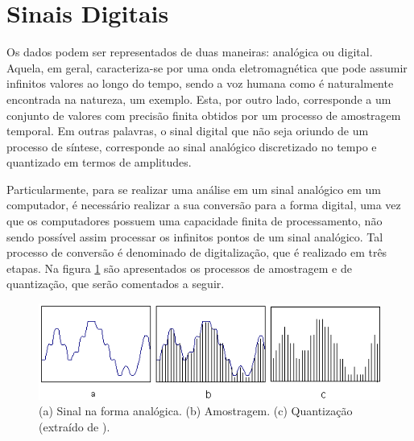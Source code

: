\documentclass[a4paper,12pt,twoside,openright]{report}
\begin{document}
\section{Sinais Digitais}
\label{sinais_digitais}
\par Os dados podem ser representados de duas maneiras: anal\'{o}gica ou digital. Aquela, em geral, caracteriza-se por uma onda eletromagn\'{e}tica que pode assumir infinitos valores ao longo do tempo, sendo a voz humana como \'{e} naturalmente encontrada na natureza, um exemplo. Esta, por outro lado, corresponde a um conjunto de valores com precis\~{a}o finita obtidos por um processo de amostragem temporal. Em outras palavras, o sinal digital que n\~{a}o seja oriundo de um processo de s\'{i}ntese, corresponde ao sinal anal\'{o}gico discretizado no tempo e quantizado em termos de amplitudes. 
\\
\par Particularmente, para se realizar uma an\'{a}lise em um sinal anal\'{o}gico em um computador, \'{e} necess\'{a}rio realizar a sua convers\~{a}o para a forma digital, uma vez que os computadores possuem uma capacidade finita de processamento, n\~{a}o sendo poss\'{i}vel assim processar os infinitos pontos de um sinal anal\'{o}gico. Tal processo de convers\~{a}o \'{e} denominado de digitaliza{\c c}\~{a}o, que \'{e} realizado em tr\^{e}s etapas. Na figura \ref{figura:quantizacao} s\~{a}o apresentados os processos de amostragem e de quantiza{\c c}\~{a}o, que ser\~{a}o comentados a seguir.
\begin{figure}[H]
\centering %
\includegraphics[width=13cm]{figuras/quant_amost.png} %
\caption{(a) Sinal na forma anal\'{o}gica. (b) Amostragem. (c) Quantiza{\c c}\~{a}o (extra\'{i}do de \cite{imagem_quantizacao}).}
\label{figura:quantizacao}
\end{figure}
\end{document}
